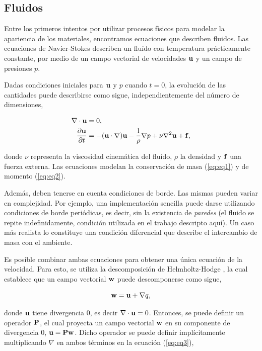 \subsection{Fluidos}
Entre los primeros intentos por utilizar procesos físicos para modelar la apariencia de los materiales, encontramos ecuaciones que describen fluidos.
Las ecuaciones de Navier-Stokes describen un fluído con temperatura prácticamente constante, por medio de un campo vectorial de velocidades $\bold{u}$ y un campo de presiones $p$.

Dadas condiciones iniciales para $\bold{u}$ y $p$ cuando $t = 0$, la evolución de las cantidades puede describirse como sigue, independientemente del número de dimensiones,

\begin{align}
\nabla \cdot \bold{u} &= 0, \label{eq:eq1}\\
\frac{\partial \bold{u} }{\partial t} &= - (\bold{u} \cdot \nabla) \bold{u} - \frac{1}{\rho} \nabla p + \nu \nabla^{2} \bold{u} + \bold{f} \label{eq:eq2},
\end{align}

donde $\nu$ representa la viscosidad cinemática del fluído, $\rho$ la densidad y $\bold{f}$ una fuerza externa.
Las ecuaciones modelan la conservación de masa (\ref{eq:eq1}) y de momento (\ref{eq:eq2}).

Además, deben tenerse en cuenta condiciones de borde.
Las mismas pueden variar en complejidad.
Por ejemplo, una implementación sencilla puede darse utilizando condiciones de borde periódicas, es decir, sin la existencia de {\em paredes} (el fluido se repite indefinidamente, condición utilizada en el trabajo descripto aquí).
Un caso más realista lo constituye una condición diferencial que describe el intercambio de masa con el ambiente.

Es posible combinar ambas ecuaciones para obtener una única ecuación de la velocidad.
Para esto, se utiliza la descomposición de Helmholtz-Hodge \cite{Chorin1990}, la cual establece que un campo vectorial $\bold{w}$ puede descomponerse como sigue, 

\begin{equation}
\label{eq:eq3}
\bold{w} = \bold{u} + \nabla q,
\end{equation}

donde $\bold{u}$ tiene divergencia $0$, es decir $\nabla\cdot\bold{u} = 0$.
Entonces, se puede definir un operador $\bold{P}$, el cual proyecta un campo vectorial $\bold{w}$ en su componente de divergencia $0$, $\bold{u} = \bold{P}\bold{w}$.
Dicho operador se puede definir implícitamente multiplicando $\nabla$ en ambos términos en la ecuación (\ref{eq:eq3}),


